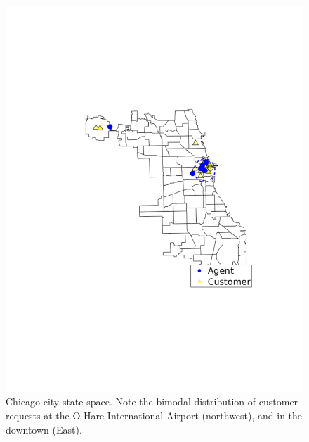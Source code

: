 \documentclass[journal]{IEEEtran}
\begin{document}
\begin{figure}
    \centering
    \includegraphics[scale = 0.45, trim={3cm 6cm 0cm 6cm}, clip]{chicago_state_space.pdf}
    \caption{Chicago city state space. Note the bimodal distribution of customer requests at the O-Hare International Airport (northwest), and in the downtown (East).}
    \label{fig:chicago_ss}
\end{figure}
\end{document}
